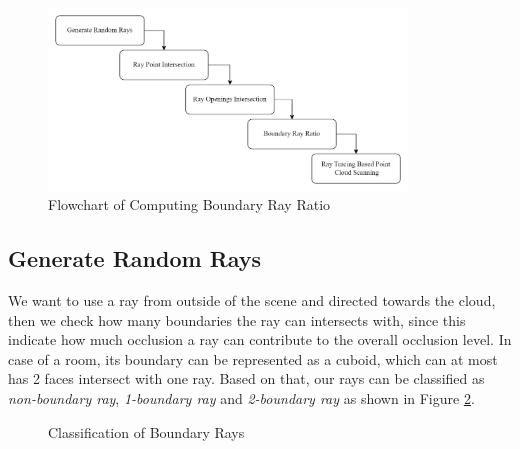 \documentclass[11pt, a4paper,oneside,chapterprefix=false]{scrbook}
\begin{document}
\begin{figure}[H]
    \centering
    \includegraphics*[width=0.85\textwidth]{figures/Compute Boundary Ray Ratio of Point Cloud.png}
    \caption{Flowchart of Computing Boundary Ray Ratio}
    \label{fig:flowchart of computing boundary ray ratio}
\end{figure}


\subsection{Generate Random Rays}

We want to use a ray from outside of the scene and directed towards the cloud, then we check how many boundaries the ray can intersects with, since this indicate how much occlusion a ray can contribute to the overall occlusion level. In case of a room, its boundary can be represented as a cuboid, which can at most has 2 faces intersect with one ray. Based on that, our rays can be classified as \emph{non-boundary ray}, \emph{1-boundary ray} and \emph{2-boundary ray} as shown in Figure \ref{classification of bound ray}.

\begin{figure}[H]
    \centering
     \label{fig:non-bound ray}
     \label{fig:1-bound ray}
      \label{fig:2-bounds ray} 
    \caption{Classification of Boundary Rays}
    \label{classification of bound ray}
\end{figure}
\end{document}
